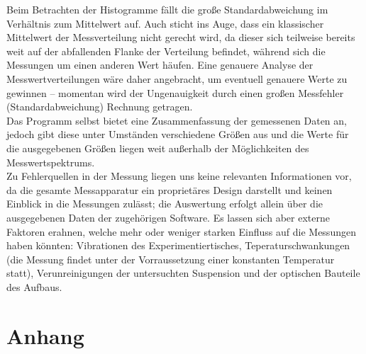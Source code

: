 \documentclass[numbers=noenddot,12pt,a4paper]{scrartcl}
\begin{document}
Beim Betrachten der Histogramme fällt die große Standardabweichung im Verhältnis zum Mittelwert auf. Auch sticht ins Auge, dass ein klassischer Mittelwert der Messverteilung nicht gerecht wird, da dieser sich teilweise bereits weit auf der abfallenden Flanke der Verteilung befindet, während sich die Messungen um einen anderen Wert häufen. Eine genauere Analyse der Messwertverteilungen wäre daher angebracht, um eventuell genauere Werte zu gewinnen -- momentan wird der Ungenauigkeit durch einen großen Messfehler (Standardabweichung) Rechnung getragen.\\
Das Programm selbst bietet eine Zusammenfassung der gemessenen Daten an, jedoch gibt diese unter Umständen verschiedene Größen aus und die Werte für die ausgegebenen Größen liegen weit außerhalb der Möglichkeiten des Messwertspektrums.\\
Zu Fehlerquellen in der Messung liegen uns keine relevanten Informationen vor, da die gesamte Messapparatur ein proprietäres Design darstellt und keinen Einblick in die Messungen zulässt; die Auswertung erfolgt allein über die ausgegebenen Daten der zugehörigen Software. Es lassen sich aber externe Faktoren erahnen, welche mehr oder weniger starken Einfluss auf die Messungen haben könnten: Vibrationen des Experimentiertisches, Teperaturschwankungen (die Messung findet unter der Vorraussetzung einer konstanten Temperatur statt), Verunreinigungen der untersuchten Suspension und der optischen Bauteile des Aufbaus.
\section{Anhang}
\end{document}
